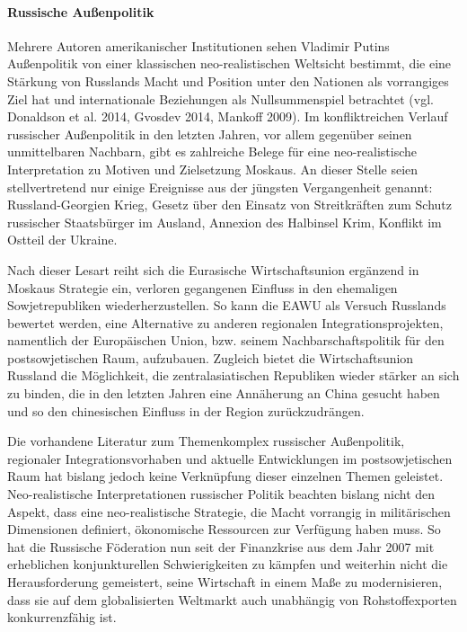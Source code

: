 \documentclass[11pt,a4paper]{article}
\begin{document}
\paragraph{Russische Außenpolitik}
Mehrere Autoren amerikanischer Institutionen sehen Vladimir Putins Außenpolitik von einer klassischen neo-realistischen Weltsicht bestimmt, die eine Stärkung von Russlands Macht und Position unter den Nationen als vorrangiges Ziel hat und internationale Beziehungen als Nullsummenspiel betrachtet (vgl. Donaldson et al. 2014, Gvosdev 2014, Mankoff 2009). Im konfliktreichen Verlauf russischer Außenpolitik in den letzten Jahren, vor allem gegenüber seinen unmittelbaren Nachbarn, gibt es zahlreiche Belege für eine neo-realistische Interpretation zu Motiven und Zielsetzung Moskaus. An dieser Stelle seien stellvertretend nur einige Ereignisse aus der jüngsten Vergangenheit genannt: Russland-Georgien Krieg, Gesetz über den Einsatz von Streitkräften zum Schutz russischer Staatsbürger im Ausland, Annexion des Halbinsel Krim, Konflikt im Ostteil der Ukraine.

Nach dieser Lesart reiht sich die Eurasische Wirtschaftsunion ergänzend in Moskaus Strategie ein, verloren gegangenen Einfluss in den ehemaligen Sowjetrepubliken wiederherzustellen. So kann die EAWU als Versuch Russlands bewertet werden, eine Alternative zu anderen regionalen Integrationsprojekten, namentlich der Europäischen Union, bzw. seinem Nachbarschaftspolitik für den postsowjetischen Raum, aufzubauen. Zugleich bietet die Wirtschaftsunion Russland die Möglichkeit, die zentralasiatischen Republiken wieder stärker an sich zu binden, die in den letzten Jahren eine Annäherung an China gesucht haben und so den chinesischen Einfluss in der Region zurückzudrängen.

Die vorhandene Literatur zum Themenkomplex russischer Außenpolitik, regionaler Integrationsvorhaben und aktuelle Entwicklungen im postsowjetischen Raum hat bislang jedoch keine Verknüpfung dieser einzelnen Themen geleistet. Neo-realistische Interpretationen russischer Politik beachten bislang nicht den Aspekt, dass eine neo-realistische Strategie, die Macht vorrangig in militärischen Dimensionen definiert, ökonomische Ressourcen zur Verfügung haben muss. So hat die Russische Föderation nun seit der Finanzkrise aus dem Jahr 2007 mit erheblichen konjunkturellen Schwierigkeiten zu kämpfen und weiterhin nicht die Herausforderung gemeistert, seine Wirtschaft in einem Maße zu modernisieren, dass sie auf dem globalisierten Weltmarkt auch unabhängig von Rohstoffexporten konkurrenzfähig ist.
\end{document}
